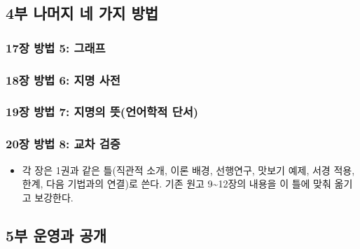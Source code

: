 \documentclass[10pt,a4paper]{article}
\providecommand{\tightlist}{\setlength{\itemsep}{0pt}\setlength{\parskip}{0pt}}
\begin{document}
\hypertarget{uxbd80-uxb098uxba38uxc9c0-uxb124-uxac00uxc9c0-uxbc29uxbc95}{%
\subsection{4부 나머지 네 가지 방법}\label{uxbd80-uxb098uxba38uxc9c0-uxb124-uxac00uxc9c0-uxbc29uxbc95}}

\hypertarget{uxc7a5-uxbc29uxbc95-5-uxadf8uxb798uxd504}{%
\subsubsection{17장 방법 5: 그래프}\label{uxc7a5-uxbc29uxbc95-5-uxadf8uxb798uxd504}}

\hypertarget{uxc7a5-uxbc29uxbc95-6-uxc9c0uxba85-uxc0acuxc804}{%
\subsubsection{18장 방법 6: 지명 사전}\label{uxc7a5-uxbc29uxbc95-6-uxc9c0uxba85-uxc0acuxc804}}

\hypertarget{uxc7a5-uxbc29uxbc95-7-uxc9c0uxba85uxc758-uxb73buxc5b8uxc5b4uxd559uxc801-uxb2e8uxc11c}{%
\subsubsection{19장 방법 7: 지명의 뜻(언어학적 단서)}\label{uxc7a5-uxbc29uxbc95-7-uxc9c0uxba85uxc758-uxb73buxc5b8uxc5b4uxd559uxc801-uxb2e8uxc11c}}

\hypertarget{uxc7a5-uxbc29uxbc95-8-uxad50uxcc28-uxac80uxc99d}{%
\subsubsection{20장 방법 8: 교차 검증}\label{uxc7a5-uxbc29uxbc95-8-uxad50uxcc28-uxac80uxc99d}}

\begin{itemize}
\tightlist
\item
  각 장은 1권과 같은 틀(직관적 소개, 이론 배경, 선행연구, 맛보기 예제, 서경 적용, 한계, 다음 기법과의 연결)로 쓴다. 기존 원고 9\textasciitilde12장의 내용을 이 틀에 맞춰 옮기고 보강한다.
\end{itemize}

\hypertarget{uxbd80-uxc6b4uxc601uxacfc-uxacf5uxac1c}{%
\subsection{5부 운영과 공개}\label{uxbd80-uxc6b4uxc601uxacfc-uxacf5uxac1c}}
\end{document}
